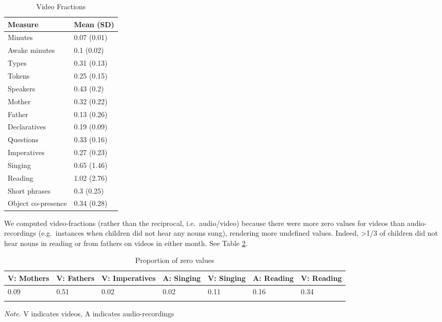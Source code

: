 \documentclass[floatsintext,man]{apa6}
\theoremstyle{definition}
\theoremstyle{definition}
\theoremstyle{definition}
\theoremstyle{remark}
\begin{document}
\begin{table}[tbp]
\begin{center}
\begin{threeparttable}
\caption{\label{tab:vboost-table}Video Fractions}
\begin{tabular}{ll}
\toprule
Measure & \multicolumn{1}{c}{Mean (SD)}\\
\midrule
Minutes & 0.07 (0.01)\\
Awake minutes & 0.1 (0.02)\\
Types & 0.31 (0.13)\\
Tokens & 0.25 (0.15)\\
Speakers & 0.43 (0.2)\\
Mother & 0.32 (0.22)\\
Father & 0.13 (0.26)\\
Declaratives & 0.19 (0.09)\\
Questions & 0.33 (0.16)\\
Imperatives & 0.27 (0.23)\\
Singing & 0.65 (1.46)\\
Reading & 1.02 (2.76)\\
Short phrases & 0.3 (0.25)\\
Object co-presence & 0.34 (0.28)\\
\bottomrule
\end{tabular}
\end{threeparttable}
\end{center}
\end{table}

We computed video-fractions (rather than the reciprocal,
i.e.~audio/video) because there were more zero values for videos than
audio-recordings (e.g.~instances when children did not hear any nouns
sung), rendering more undefined values. Indeed, \textgreater{}1/3 of
children did not hear nouns in reading or from fathers on videos in
either month. See Table \ref{tab:propna-missing-tables}.

\begin{table}[tbp]
\begin{center}
\begin{threeparttable}
\caption{\label{tab:propna-missing-tables}Proportion of zero values}
\small{
\begin{tabular}{lllllll}
\toprule
V: Mothers & \multicolumn{1}{c}{V: Fathers} & \multicolumn{1}{c}{V: Imperatives} & \multicolumn{1}{c}{A: Singing} & \multicolumn{1}{c}{V: Singing} & \multicolumn{1}{c}{A: Reading} & \multicolumn{1}{c}{V: Reading}\\
\midrule
0.09 & 0.51 & 0.02 & 0.02 & 0.11 & 0.16 & 0.34\\
\bottomrule
\addlinespace
\end{tabular}
}
\begin{tablenotes}[para]
\textit{Note.} V indicates videos, A indicates audio-recordings
\end{tablenotes}
\end{threeparttable}
\end{center}
\end{table}
\end{document}
